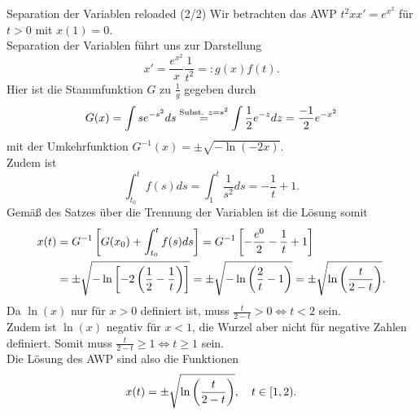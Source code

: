 \begin{Beispiel}
{Separation der Variablen reloaded (2/2)}
Wir betrachten das AWP $\boxed{t^2xx'=e^{x^2}}$ für $t>0$ mit $x(1)=0$.\\
Separation der Variablen führt uns zur Darstellung
\begin{equation*}
    x'=\frac{e^{x^2}}{x}\frac{1}{t^2}=:g(x)f(t).
\end{equation*}
Hier ist die Stammfunktion $G$ zu $\frac{1}{g}$ gegeben durch
\begin{equation*}
    G(x)=\int s e^{-s^2}ds\overset{\text{Subst. }z=s^2}{=}\int\frac{1}{2}e^{-z}dz=\frac{-1}{2}e^{-x^2}
\end{equation*}
mit der Umkehrfunktion $G^{-1}(x)=\pm\sqrt{-\ln(-2x)}$.\\
Zudem ist
\begin{equation}
    \int_{t_0}^tf(s)ds=\int_1^t\frac{1}{s^2}ds=-\frac{1}{t}+1.
\end{equation}
Gemäß des Satzes über die Trennung der Variablen ist die Lösung somit
\begin{align*}
    x(t)&=G^{-1}\left[{G(x_0)+\int_{t_0}^tf(s)ds}\right]=G^{-1}\left[{-\frac{e^0}{2}-\frac{1}{t}+1}\right]\\
    &=\pm\sqrt{-\ln\left[{-2\left({\frac{1}{2}-\frac{1}{t}}\right)}\right]}=\pm\sqrt{-\ln\left({\frac{2}{t}-1}\right)}=\pm\sqrt{\ln\left({\frac{t}{2-t}}\right)}.
\end{align*}
Da $\ln(x)$ nur für $x>0$ definiert ist, muss $\frac{t}{2-t}>0\iff t<2$ sein.\\
Zudem ist $\ln(x)$ negativ für $x<1$, die Wurzel aber nicht für negative Zahlen definiert. Somit muss $\frac{t}{2-t}\geq1\iff t\geq1$ sein.\\
Die Lösung des AWP sind also die Funktionen
\begin{equation*}
    x(t)=\pm\sqrt{\ln\left({\frac{t}{2-t}}\right)},\quad t\in[1,2).
\end{equation*}
\end{Beispiel}